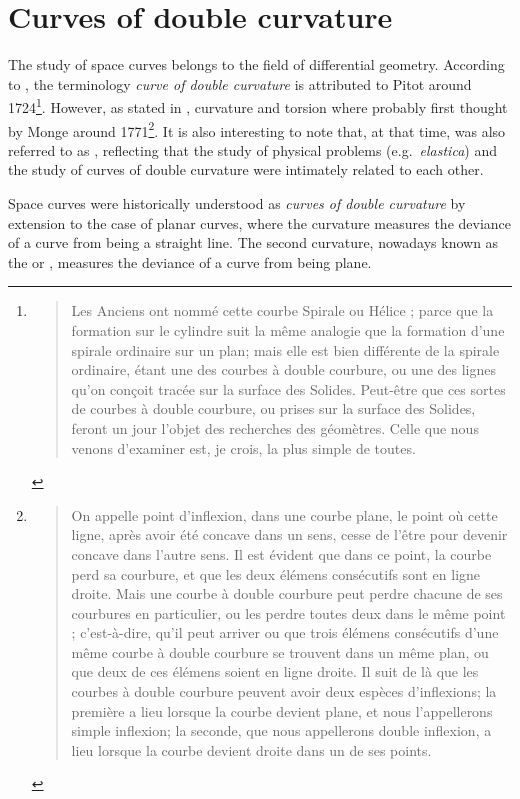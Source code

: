 \section{Curves of double curvature}

The study of space curves belongs to the field of differential geometry. According to \cite[p.28]{Delcourt2007}, the terminology \emph{curve of double curvature} is attributed to Pitot around 1724\footnote{
\blockcquote[p.28]{Pitot1726}{
Les Anciens ont nommé cette courbe Spirale ou Hélice ; parce que la formation sur le cylindre suit la même analogie que la formation d’une spirale ordinaire sur un plan; mais elle est bien différente de la spirale ordinaire, étant une des courbes à double courbure, ou une des lignes qu’on conçoit tracée sur la surface des Solides. Peut-être que ces sortes de courbes à double courbure, ou prises sur la surface des Solides, feront un jour l’objet des recherches des géomètres. Celle que nous venons d’examiner est, je crois, la plus simple de toutes.
}}.
However, as stated in \cite[p.321]{Coolidge2013}, curvature and torsion where probably first thought by Monge around 1771\footnote{
\blockcquote[p.363]{Monge1809}{
On appelle point d'inflexion, dans une courbe plane, le point où cette ligne, après avoir été concave dans un sens, cesse de l'être pour devenir concave dans l'autre sens. Il est évident que dans ce point, la courbe perd sa courbure, et que les deux élémens consécutifs sont en ligne droite. Mais une courbe à double courbure peut perdre chacune de ses courbures en particulier, ou les perdre toutes deux dans le même point ; c'est-à-dire, qu'il peut arriver ou que trois élémens consécutifs d'une même courbe à double courbure se trouvent dans un même plan, ou que deux de ces élémens soient en ligne droite. Il suit de là que les courbes à double courbure peuvent avoir deux espèces d'inflexions; la première a lieu lorsque la courbe devient plane, et nous l'appellerons simple inflexion; la seconde, que nous appellerons double inflexion, a lieu lorsque la courbe devient droite dans un de ses points.
}}. It is also interesting to note that, at that time,  was also referred to as , reflecting that the study of physical problems (e.g.\ \emph{elastica}) and the study of curves of double curvature were intimately related to each other.

Space curves were historically understood as \emph{curves of double curvature} by extension to the case of planar curves, where the curvature measures the deviance of a curve from being a straight line. The second curvature, nowadays known as the  or , measures the deviance of a curve from being plane. 


